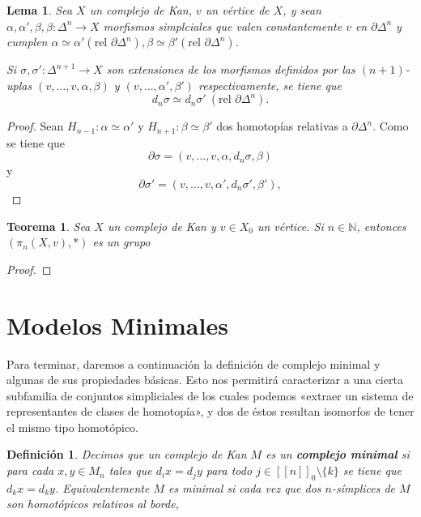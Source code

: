 \documentclass[11pt]{report}
\theoremstyle{colored}
\newtheorem{definition}{Definición}[section]
\newtheorem{theorem}{Teorema}[section]
\newtheorem{lemma}{Lema}[section]
\newcommand{\N}{\mathbb{N}}
\newcommand{\nat}[1]{[\![#1]\!]}
\renewcommand{\ss}[1]{\Delta^{#1}}
\newcommand{\guill}[1]{«#1»}
\begin{document}
\begin{lemma} Sea $X$ un complejo de Kan, $v$ un vértice de $X$, y sean $\alpha,\alpha',\beta,\beta : \ss{n} \to X$ morfismos simplciales que valen constantemente $v$ en $\partial \ss{n}$ y cumplen $\alpha \simeq \alpha' (\text{rel $\partial \ss{n}$}), \beta \simeq \beta' (\text{rel $\partial \ss{n}$})$. 

Si $\sigma, \sigma' : \ss{n+1} \to X$ son extensiones de los morfismos definidos por las $(n+1)$-uplas $(v,\dots,v,\alpha,\beta)$ y $(v,\dots,\alpha',\beta')$ respectivamente, se tiene que
\[
d_n\sigma \simeq d_n\sigma' \ (\text{rel $\partial \ss{n}$}).
\] 
\end{lemma}
\begin{proof} Sean $H_{n-1} : \alpha \simeq \alpha'$ y $H_{n+1} : \beta \simeq \beta'$ dos homotopías relativas a $\partial \ss{n}$. Como se tiene que
\[
\partial \sigma = (v,\dots,v,\alpha,d_n\sigma,\beta)
\]
y
\[
\partial \sigma' = (v,\dots,v,\alpha',d_n\sigma',\beta'),
\]
\end{proof}

\begin{theorem} Sea $X$ un complejo de Kan y $v \in X_0$ un vértice. Si $n \in \N$, entonces $(\pi_n(X,v),\ast)$ es un grupo
\end{theorem}
\begin{proof}
\end{proof}

\section{Modelos Minimales}

Para terminar, daremos a continuación la definición de complejo minimal y algunas de sus propiedades básicas. Esto nos permitirá caracterizar a una cierta subfamilia de conjuntos simpliciales de los cuales podemos \guill{extraer un sistema de representantes de clases de homotopía}, y dos de éstos resultan isomorfos de tener el mismo tipo homotópico.

\begin{definition} Decimos que un complejo de Kan $M$ es un \textbf{complejo minimal} si para cada $x,y \in M_n$ tales que $d_ix = d_jy$ para todo $j \in \nat{n}_0 \setminus \{k\}$ se tiene que $d_kx = d_ky$. Equivalentemente $M$ es minimal si cada vez que dos $n$-símplices de $M$ son homotópicos relativos al borde, 
\end{definition}
\end{document}
